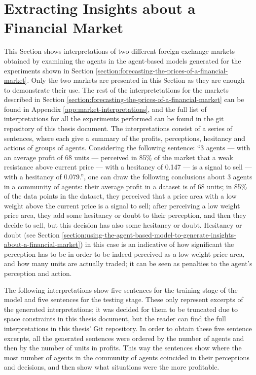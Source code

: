\newpage

\section{Extracting Insights about a Financial Market}
\label{section:extracting-insights-about-a-financial-market}

This Section shows interpretations of two different foreign exchange markets
obtained by examining the agents in the agent-based models generated for the
experiments shown in Section
\ref{section:forecasting-the-prices-of-a-financial-market}. Only the two markets
are presented in this Section as they are enough to demonstrate their use. The
rest of the interpretetations for the markets described in Section
\ref{section:forecasting-the-prices-of-a-financial-market} can be found in
Appendix \ref{app:market-interpretations}, and the full list of interpretations
for all the experiments performed can be found in the git repository of this
thesis document. The interpretations
consist of a series of sentences, where each give a summary of the profits,
perceptions, hesitancy and actions of groups of agents. Considering the
following sentence: ``3 agents — with an average profit of 68 units — perceived
in 85\% of the market that a weak resistance above current price — with a
hesitancy of 0.147 — is a signal to sell — with a hesitancy of 0.079.'', one can
draw the following conclusions about 3 agents in a community of agents: their
average profit in a dataset is of 68 units; in 85\% of the data points in the
dataset, they perceived that a price area with a low weight above the current
price is a signal to sell; after perceiving a low weight price area, they add
some hesitancy or doubt to their perception, and then they decide to sell, but
this decision has also some hesitancy or doubt. Hesitancy or doubt (see Section
\ref{section:using-the-agent-based-model-to-generate-insights-about-a-financial-market})
in this case is an indicative of how significant the perception has to be in
order to be indeed perceived as a low weight price area, and how many units are
actually traded; it can be seen as penalties to the agent's perception and
action.

The following interpretations show five sentences for the training stage of the
model and five sentences for the testing stage. These only represent excerpts of
the generated interpretations; it was decided for them to be truncated due to
space constraints in this thesis document, but the reader can find the full
interpretations in this thesis' Git repository. In order to obtain these five
sentence excerpts, all the generated sentences were ordered by the number of
agents and then by the number of units in profits. This way the sentences show
where the most number of agents in the community of agents coincided in their
perceptions and decisions, and then show what situations were the more
profitable.

